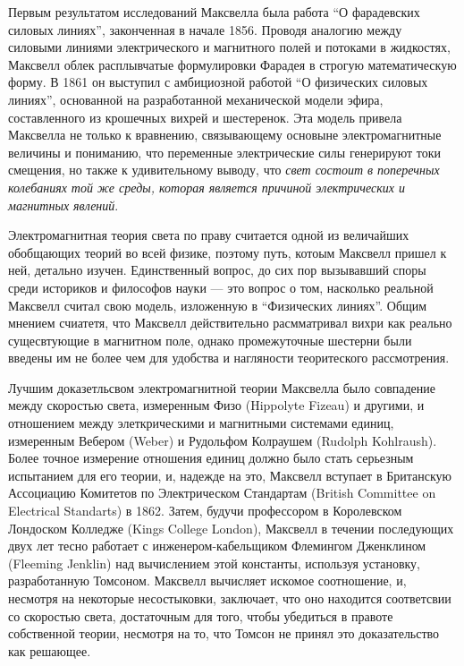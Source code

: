 \documentclass[12pt, oneside, a4paper]{article}
\begin{document}
Первым результатом исследований Максвелла была работа ``О фарадевских силовых линиях'', законченная в начале 1856. Проводя аналогию между силовыми линиями электрического и магнитного полей и потоками в жидкостях, Максвелл облек расплывчатые формулировки Фарадея в строгую математическую форму. В 1861 он выступил с амбициозной работой ``О физических силовых линиях'', основанной на разработанной механической модели эфира, составленного из крошечных вихрей и шестеренок. Эта модель привела Максвелла не только к вравнению, связывающему основыне электромагнитные величины и пониманию, что переменные электрические силы генерируют токи смещения, но также к удивительному выводу, что \emph{свет состоит в поперечных колебаниях той же среды, которая является причиной электрических и магнитных явлений}. 

Электромагнитная теория света по праву считается одной из величайших обобщающих теорий во всей физике, поэтому путь, котоым Максвелл пришел к ней, детально изучен. Единственный вопрос, до сих пор вызывавший споры среди историков и философов науки --- это вопрос о том, насколько реальной Максвелл считал свою модель, изложенную в ``Физических линиях''. Общим мнением счиатетя, что Максвелл действительно расмматривал вихри как реально сущесвтующие в магнитном поле, однако промежуточные шестерни были введены им не более чем для удобства и нагляности теоритеского рассмотрения. 

Лучшим доказетльсвом электромагнитной теории Максвелла было совпадение между скоростью света, измеренным Физо (Hippolyte Fizeau) и другими, и отношением между элеткрическими и магнитными системами единиц, измеренным Вебером (Weber) и Рудольфом Колраушем (Rudolph Kohlraush). Более точное измерение отношения единиц должно было стать серьезным испытанием для его теории, и, надежде на это, Максвелл вступает в Британскую Ассоциацию Комитетов по Электрическом Стандартам (British Committee on Electrical Standarts) в 1862. Затем, будучи профессором в Королевском Лондоском Колледже (Kings College London), Максвелл в течении последующих двух лет тесно работает с инженером-кабельщиком Флемингом Дженклином (Fleeming Jenklin) над вычислением этой константы, используя установку, разработанную Томсоном. Максвелл вычисляет искомое соотношение, и, несмотря на некоторые несостыковки, заключает, что оно находится соответсвии со скоростью света, достаточным для того, чтобы убедиться в правоте собственной теории, несмотря на то, что Томсон не принял это доказательство как решающее. 
\end{document}

